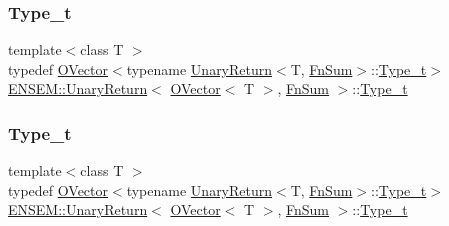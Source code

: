 \subsubsection{\texorpdfstring{Type\_t}{Type\_t}\hspace{0.1cm}{\footnotesize\ttfamily [1/3]}}
{\footnotesize\ttfamily template$<$class T $>$ \\
typedef \mbox{\hyperlink{classENSEM_1_1OVector}{O\+Vector}}$<$typename \mbox{\hyperlink{structENSEM_1_1UnaryReturn}{Unary\+Return}}$<$T, \mbox{\hyperlink{structENSEM_1_1FnSum}{Fn\+Sum}}$>$\+::\mbox{\hyperlink{structENSEM_1_1UnaryReturn_3_01OVector_3_01T_01_4_00_01FnSum_01_4_aeade0fc333784b1705f2ab3348b5fed1}{Type\+\_\+t}}$>$ \mbox{\hyperlink{structENSEM_1_1UnaryReturn}{E\+N\+S\+E\+M\+::\+Unary\+Return}}$<$ \mbox{\hyperlink{classENSEM_1_1OVector}{O\+Vector}}$<$ T $>$, \mbox{\hyperlink{structENSEM_1_1FnSum}{Fn\+Sum}} $>$\+::\mbox{\hyperlink{structENSEM_1_1UnaryReturn_3_01OVector_3_01T_01_4_00_01FnSum_01_4_aeade0fc333784b1705f2ab3348b5fed1}{Type\+\_\+t}}}

\mbox{\label{structENSEM_1_1UnaryReturn_3_01OVector_3_01T_01_4_00_01FnSum_01_4_aeade0fc333784b1705f2ab3348b5fed1}} 
\subsubsection{\texorpdfstring{Type\_t}{Type\_t}\hspace{0.1cm}{\footnotesize\ttfamily [2/3]}}
{\footnotesize\ttfamily template$<$class T $>$ \\
typedef \mbox{\hyperlink{classENSEM_1_1OVector}{O\+Vector}}$<$typename \mbox{\hyperlink{structENSEM_1_1UnaryReturn}{Unary\+Return}}$<$T, \mbox{\hyperlink{structENSEM_1_1FnSum}{Fn\+Sum}}$>$\+::\mbox{\hyperlink{structENSEM_1_1UnaryReturn_3_01OVector_3_01T_01_4_00_01FnSum_01_4_aeade0fc333784b1705f2ab3348b5fed1}{Type\+\_\+t}}$>$ \mbox{\hyperlink{structENSEM_1_1UnaryReturn}{E\+N\+S\+E\+M\+::\+Unary\+Return}}$<$ \mbox{\hyperlink{classENSEM_1_1OVector}{O\+Vector}}$<$ T $>$, \mbox{\hyperlink{structENSEM_1_1FnSum}{Fn\+Sum}} $>$\+::\mbox{\hyperlink{structENSEM_1_1UnaryReturn_3_01OVector_3_01T_01_4_00_01FnSum_01_4_aeade0fc333784b1705f2ab3348b5fed1}{Type\+\_\+t}}}


